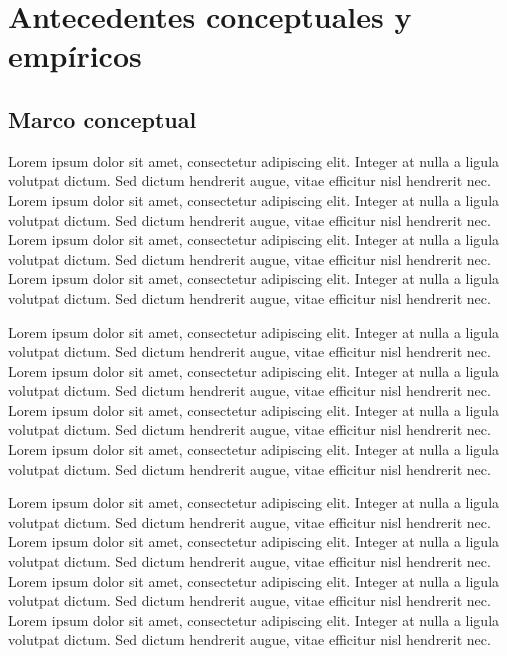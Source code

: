 \documentclass[
  spanish,
  a4paper,
  oneside]{scrbook}
\begin{document}

\chapter{Antecedentes conceptuales y
empíricos}\label{antecedentes-conceptuales-y-empuxedricos}

\section{Marco conceptual}\label{marco-conceptual}

Lorem ipsum dolor sit amet, consectetur adipiscing elit. Integer at
nulla a ligula volutpat dictum. Sed dictum hendrerit augue, vitae
efficitur nisl hendrerit nec. Lorem ipsum dolor sit amet, consectetur
adipiscing elit. Integer at nulla a ligula volutpat dictum. Sed dictum
hendrerit augue, vitae efficitur nisl hendrerit nec. Lorem ipsum dolor
sit amet, consectetur adipiscing elit. Integer at nulla a ligula
volutpat dictum. Sed dictum hendrerit augue, vitae efficitur nisl
hendrerit nec. Lorem ipsum dolor sit amet, consectetur adipiscing elit.
Integer at nulla a ligula volutpat dictum. Sed dictum hendrerit augue,
vitae efficitur nisl hendrerit nec.

Lorem ipsum dolor sit amet, consectetur adipiscing elit. Integer at
nulla a ligula volutpat dictum. Sed dictum hendrerit augue, vitae
efficitur nisl hendrerit nec. Lorem ipsum dolor sit amet, consectetur
adipiscing elit. Integer at nulla a ligula volutpat dictum. Sed dictum
hendrerit augue, vitae efficitur nisl hendrerit nec. Lorem ipsum dolor
sit amet, consectetur adipiscing elit. Integer at nulla a ligula
volutpat dictum. Sed dictum hendrerit augue, vitae efficitur nisl
hendrerit nec. Lorem ipsum dolor sit amet, consectetur adipiscing elit.
Integer at nulla a ligula volutpat dictum. Sed dictum hendrerit augue,
vitae efficitur nisl hendrerit nec.

Lorem ipsum dolor sit amet, consectetur adipiscing elit. Integer at
nulla a ligula volutpat dictum. Sed dictum hendrerit augue, vitae
efficitur nisl hendrerit nec. Lorem ipsum dolor sit amet, consectetur
adipiscing elit. Integer at nulla a ligula volutpat dictum. Sed dictum
hendrerit augue, vitae efficitur nisl hendrerit nec. Lorem ipsum dolor
sit amet, consectetur adipiscing elit. Integer at nulla a ligula
volutpat dictum. Sed dictum hendrerit augue, vitae efficitur nisl
hendrerit nec. Lorem ipsum dolor sit amet, consectetur adipiscing elit.
Integer at nulla a ligula volutpat dictum. Sed dictum hendrerit augue,
vitae efficitur nisl hendrerit nec.
\end{document}
